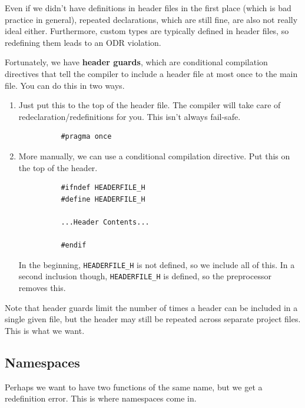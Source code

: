 \documentclass{article}
\newcounter{definition}[section]
\begin{document}
    Even if we didn't have definitions in header files in the first place (which is bad practice in general), repeated declarations, which are still fine, are also not really ideal either. Furthermore, custom types are typically defined in header files, so redefining them leads to an ODR violation. 
    
    \begin{definition}
      \label{def:header-guards}
      Fortunately, we have \textbf{header guards}, which are conditional compilation directives that tell the compiler to include a header file at most once to the main file. You can do this in two ways. 
      \begin{enumerate}
        \item Just put this to the top of the header file. The compiler will take care of redeclaration/redefinitions for you. This isn't always fail-safe. 
        \begin{lstlisting}
          #pragma once
        \end{lstlisting} 

      \item More manually, we can use a conditional compilation directive. Put this on the top of the header. 
        \begin{lstlisting}
          #ifndef HEADERFILE_H
          #define HEADERFILE_H 
          
          ...Header Contents...

          #endif 
        \end{lstlisting}
        In the beginning, \texttt{HEADERFILE\_H} is not defined, so we include all of this. In a second inclusion though, \texttt{HEADERFILE\_H} is defined, so the preprocessor removes this. 
      \end{enumerate}

      Note that header guards limit the number of times a header can be included in a single given file, but the header may still be repeated across separate project files. This is what we want. 
    \end{definition}

  \subsection{Namespaces} 

    Perhaps we want to have two functions of the same name, but we get a redefinition error. This is where namespaces come in. 
\end{document}
